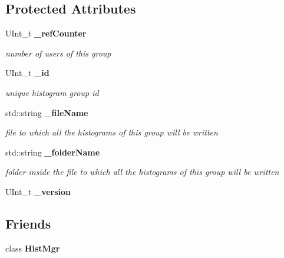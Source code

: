 \subsection*{Protected Attributes}
\begin{DoxyCompactItemize}
\item 
UInt\_\-t {\bf \_\-refCounter}\label{classhistmgr_1_1HistMgr_1_1HistogramGroupData__t_a9e13ffec297c7682e7846f3fc96a4904}

\begin{DoxyCompactList}\small\item\em number of users of this group \item\end{DoxyCompactList}\item 
UInt\_\-t {\bf \_\-id}\label{classhistmgr_1_1HistMgr_1_1HistogramGroupData__t_a2aa126884bac9c85f0063466bcc44d47}

\begin{DoxyCompactList}\small\item\em unique histogram group id \item\end{DoxyCompactList}\item 
std::string {\bf \_\-fileName}\label{classhistmgr_1_1HistMgr_1_1HistogramGroupData__t_a887041e492c5179f576e2ff0348286e0}

\begin{DoxyCompactList}\small\item\em file to which all the histograms of this group will be written \item\end{DoxyCompactList}\item 
std::string {\bf \_\-folderName}\label{classhistmgr_1_1HistMgr_1_1HistogramGroupData__t_a1a2b8f1b779a7d2f62da302d4d77b620}

\begin{DoxyCompactList}\small\item\em folder inside the file to which all the histograms of this group will be written \item\end{DoxyCompactList}\item 
UInt\_\-t {\bfseries \_\-version}\label{classhistmgr_1_1HistMgr_1_1HistogramGroupData__t_a14fe90666c845803d60b98ac8d15db85}

\end{DoxyCompactItemize}
\subsection*{Friends}
\begin{DoxyCompactItemize}
\item 
class {\bfseries HistMgr}\label{classhistmgr_1_1HistMgr_1_1HistogramGroupData__t_a3cc85db784d7651390e41024125eb3a0}

\end{DoxyCompactItemize}


